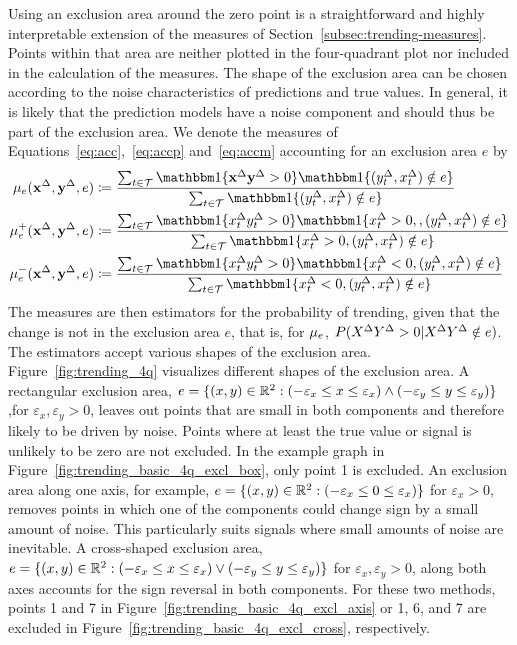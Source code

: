 Using an exclusion area around the zero point is a straightforward and highly interpretable extension of the measures of Section~\ref{subsec:trending-measures}.
Points within that area are neither plotted in the four-quadrant plot nor included in the calculation of the measures.
The shape of the exclusion area can be chosen according to the noise characteristics of predictions and true values.
In general, it is likely that the prediction models have a noise component and should thus be part of the exclusion area.
We denote the measures of Equations~\eqref{eq:acc},~\eqref{eq:accp} and~\eqref{eq:accm} accounting for an exclusion area $e$ by
\begin{align}
    \acceps (\diffx, \diffy, e) &\coloneqq \frac{\sum_{t \in \mathcal{T}} \ind{\diffx \diffy > 0} \ind{(\diffyt, \diffxt) \notin e}}{\sum_{t \in \mathcal{T}} \ind{(\diffyt, \diffxt) \notin e}}\label{eq:acceps}\\
    \accpeps (\diffx, \diffy, e) &\coloneqq \frac{\sum_{t \in \mathcal{T}} \ind{\diffxt \diffyt > 0} \ind{\diffxt > 0, , (\diffyt, \diffxt) \notin e}}{\sum_{t \in \mathcal{T}} \ind{\diffxt > 0, (\diffyt, \diffxt) \notin e}} \label{eq:accpeps}\\
    \accmeps (\diffx, \diffy, e) &\coloneqq \frac{\sum_{t \in \mathcal{T}} \ind{\diffxt \diffyt > 0} \ind{\diffxt < 0, (\diffyt, \diffxt) \notin e}}{\sum_{t \in \mathcal{T}} \ind{\diffxt < 0, (\diffyt, \diffxt) \notin e}}\label{eq:accmeps}
\end{align}
The measures are then estimators for the probability of trending, given that the change is not in the exclusion area $e$, that is, for $\mu_{e}$, $P(X^{\Delta} Y^{\Delta} > 0 | X^{\Delta} Y^{\Delta} \notin e)$.
The estimators accept various shapes of the exclusion area.
Figure~\ref{fig:trending_4q} visualizes different shapes of the exclusion area.
A rectangular exclusion area, $e = \{(x, y) \in \mathbb{R}^2: (-\varepsilon_x \leq x \leq \varepsilon_x) \land (-\varepsilon_y \leq y \leq \varepsilon_y) \}$ ,for $\varepsilon_x, \varepsilon_y > 0$, leaves out points that are small in both components and therefore likely to be driven by noise.
Points where at least the true value or signal is unlikely to be zero are not excluded.
In the example graph in Figure~\ref{fig:trending_basic_4q_excl_box}, only point 1 is excluded.
An exclusion area along one axis, for example, $e = \{(x, y) \in \mathbb{R}^2: (-\varepsilon_x \leq 0 \leq \varepsilon_x)\}$ for $\varepsilon_x > 0$, removes points in which one of the components could change sign by a small amount of noise.
This particularly suits signals where small amounts of noise are inevitable.
A cross-shaped exclusion area, $e = \{(x, y) \in \mathbb{R}^2: (-\varepsilon_x \leq x \leq \varepsilon_x) \lor (-\varepsilon_y \leq y \leq \varepsilon_y) \}$ for $\varepsilon_x, \varepsilon_y > 0$, along both axes accounts for the sign reversal in both components.
For these two methods, points 1 and 7 in Figure~\ref{fig:trending_basic_4q_excl_axis} or 1, 6, and 7 are excluded in Figure~\ref{fig:trending_basic_4q_excl_cross}, respectively.

